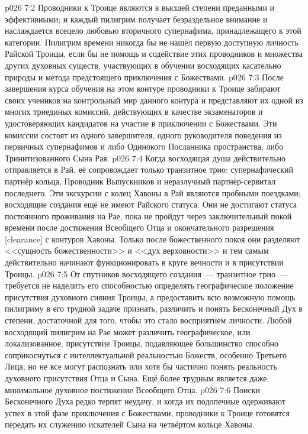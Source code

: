 \vs p026 7:2 Проводники к Троице являются в высшей степени преданными и эффективными; и каждый пилигрим получает безраздельное внимание и наслаждается всецело любовью вторичного супернафима, принадлежащего к этой категории. Пилигрим времени никогда бы не нашёл первую доступную личность Райской Троицы, если бы не помощь и содействие этих проводников и множества других духовных существ, участвующих в обучении восходящих касательно природы и метода предстоящего приключения с Божествами.
\vs p026 7:3 После завершения курса обучения на этом контуре проводники к Троице забирают своих учеников на контрольный мир данного контура и представляют их одной из многих триединых комиссий, действующих в качестве экзаменаторов и удостоверяющих кандидатов на участие в приключении с Божествами. Эти комиссии состоят из одного завершителя, одного руководителя поведения из первичных супернафимов и либо Одинокого Посланника пространства, либо Тринитизованного Сына Рая.
\vs p026 7:4 Когда восходящая душа действительно отправляется в Рай, её сопровождает только транзитное трио: супернафический партнёр кольца, Проводник Выпускников и неразлучный партнёр\hyp{}сервитал последнего. Эти экскурсии с колец Хавоны в Рай являются пробными поездками; восходящие создания ещё не имеют Райского статуса. Они не достигают статуса постоянного проживания на Рае, пока не пройдут через заключительный покой времени после достижения Всеобщего Отца и окончательного разрешения [clearance] с контуров Хавоны. Только после божественного покоя они разделяют <<сущность божественности>> и <<дух верховности>> и тем самым действительно начинают функционировать в круге вечности и в присутствии Троицы.
\vs p026 7:5 \pc От спутников восходящего создания~--- транзитное трио~--- требуется не наделить его способностью определять географическое положение присутствия духовного сияния Троицы, а предоставить всю возможную помощь пилигриму в его трудной задаче признать, различить и понять Бесконечный Дух в степени, достаточной для того, чтобы это стало восприятием личности. Любой восходящий пилигрим на Рае может различить географическое, или локализованное, присутствие Троицы, подавляющее большинство способно соприкоснуться с интеллектуальной реальностью Божеств, особенно Третьего Лица, но не все могут распознать или хотя бы частично понять реальность духовного присутствия Отца и Сына. Ещё более трудным является даже минимальное духовное постижение Всеобщего Отца.
\vs p026 7:6 Поиски Бесконечного Духа редко терпят неудачу, и когда их подопечные одерживают успех в этой фазе приключения с Божествами, проводники к Троице готовятся передать их служению искателей Сына на четвёртом кольце Хавоны.
